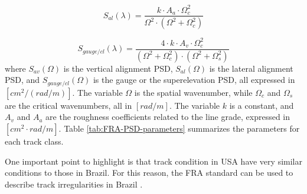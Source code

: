\begin{equation}
    S_{al}(\lambda) = \frac{k \cdot A_a \cdot \Omega_c^2}{\Omega^2 \cdot \left(\Omega^2 + \Omega_c^2\right)}
    \label{eq:FRA-lateral}
\end{equation}

\begin{equation}
    S_{gauge/cl}(\lambda) = \frac{4 \cdot k \cdot A_v \cdot \Omega_c^2}{\left(\Omega^2 + \Omega_c^2\right) \cdot \left(\Omega^2 + \Omega_s^2\right)}
    \label{eq:FRA-gauge}
\end{equation}
where $S_{av}(\Omega)$ is the vertical alignment PSD, $S_{al}(\Omega)$ is the lateral alignment PSD, and $S_{gauge/cl}(\Omega)$ is the gauge or the superelevation PSD, all expressed in $[cm^2 / (rad/m)]$. The variable $\Omega$ is the spatial wavenumber, while $\Omega_c$ and $\Omega_s$ are the critical wavenumbers, all in $[rad/m]$. The variable $k$ is a constant, and $A_v$ and $A_a$ are the roughness coefficients related to the line grade, expressed in $[cm^2 \cdot rad /m]$. Table \ref{tab:FRA-PSD-parameters} summarizes the parameters for each track class.

\begin{table}[h!]
\centering
{}
\caption{Summary of the parameters for each track class. \cite{PIRES2021107806}}
\label{tab:FRA-PSD-parameters}
\end{table}

One important point to highlight is that track condition in USA have very similar conditions to those in Brazil. For this reason, the FRA standard can be used to describe track irregularities in Brazil \cite{PIRES2021107806}.


